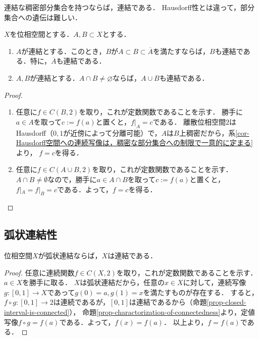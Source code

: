 \documentclass[uplatex,dvipdfmx]{jsreport}
\begin{document}
\begin{tcolorbox}[colframe=ForestGreen, colback=ForestGreen!10!white,breakable,colbacktitle=ForestGreen!40!white,coltitle=black,fonttitle=\bfseries\sffamily,
title=]
    連結な稠密部分集合を持つならば，連結である．
    Hausdorff性とは違って，部分集合への遺伝は難しい．
\end{tcolorbox}

\begin{corollary}[連結性の伝播]\label{cor-connectedness-over-union}
    $X$を位相空間とする．$A,B\subset X$とする．
    \begin{enumerate}
        \item $A$が連結とする．このとき，$B$が$A\subset B\subset\overline{A}$を満たすならば，$B$も連結である．特に，$\overline{A}$も連結である．
        \item $A,B$が連結とする．$A\cap B\ne\varnothing$ならば，$A\cup B$も連結である．
    \end{enumerate}
\end{corollary}
\begin{proof}\mbox{}
    \begin{enumerate}
        \item 任意に$f\in C(B,2)$を取り，これが定数関数であることを示す．
        勝手に$a\in A$を取って$c:=f(a)$と置くと，$f|_A=c$である．
        離散位相空間$2$はHausdorff（$0,1$が近傍によって分離可能）で，$A$は$B$上稠密だから，系\ref{cor-Hausdorff空間への連続写像は，稠密な部分集合への制限で一意的に定まる}より，
        $f=c$を得る．
        \item 任意に$f\in C(A\cup B,2)$を取り，これが定数関数であることを示す．
        $A\cap B\ne\emptyset$なので，勝手に$a\in A\cap B$を取って$c:=f(a)$と置くと，$f|_A=f|_B=c$である．よって，$f=c$を得る．
    \end{enumerate}
\end{proof}

\subsection{弧状連結性}

\begin{corollary}[弧状連結ならば連結]
    位相空間$X$が弧状連結ならば，$X$は連結である．
\end{corollary}
\begin{proof}
    任意に連続関数$f\in C(X,2)$を取り，これが定数関数であることを示す．
    $a\in X$を勝手に取る．
    $X$は弧状連結だから，任意の$x\in X$に対して，連続写像$g:[0,1]\to X$であって$g(0)=a,g(1)=x$を満たすものが存在する．
    すると，$f\circ g:[0,1]\to 2$は連続であるが，$[0,1]$は連結であるから（命題\ref{prop-closed-interval-is-connected}），
    命題\ref{prop-charactorization-of-connectedness}より，定値写像$f\circ g=f(a)$である．よって，$f(x)=f(a)$．
    以上より，$f=f(a)$である．
\end{proof}
\end{document}
